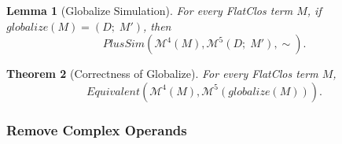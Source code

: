 \documentclass[10pt]{article}
\theoremstyle{acmplain}
\newtheorem{theorem}{Theorem}[section]
\newtheorem{lemma}[theorem]{Lemma}
\newcommand{\pass}[1]{\mathit{#1}}
\newcommand{\Mach}[1]{\mathcal{M}^{#1}}
\newcommand{\Equiv}{\mathit{Equivalent}}
\begin{document}
\begin{lemma}[Globalize Simulation]\label{lem:globalize-fsim}
For every FlatClos term $M$, if $\pass{globalize}(M) = (D;\; M')$, then
\[
  \mathit{PlusSim}(\Mach{4}(M), \Mach{5}(D;\; M'), \sim) .
\]
\end{lemma}

\begin{theorem}[Correctness of Globalize]\label{thm:globalize-correct}
For every FlatClos term $M$,
\[
  \Equiv(\Mach{4}(M), \Mach{5}(\pass{globalize}(M))) .
\]
\end{theorem}

\subsubsection{Remove Complex Operands}\label{sec:sim-rco}
\end{document}

